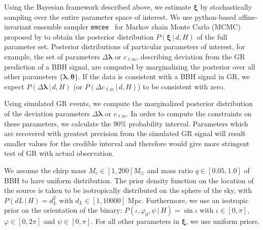 \documentclass[prd,preprintnumbers,twocolumn,eqsecnum,floatfix,a4paper,nofootinbib,superscriptaddress]{revtex4}
\newcommand{\blambda}{\bm{\lambda}}
\newcommand{\btheta}{\bm{\theta}}
\newcommand{\bxi}{\bm{\xi}}
\begin{document}
Using the Bayesian framework described above, we estimate $\bxi$ by stochastically sampling over the entire parameter space of interest. We use python-based affine-invariant ensemble sampler \texttt{emcee}~\cite{foreman2013emcee} for Markov chain Monte Carlo (MCMC) proposed by \cite{goodman2010ensemble} to obtain the posterior distribution $P(\bxi \, | \, d, H)$ of the full parameter set. Posterior distributions of particular parameters of interest, for example,  the set of parameters ${\Delta \blambda}$ or $c_{\ell m}$, describing deviation from the GR prediction of a BBH signal, are computed  by marginalizing the posterior over all other parameters $\{\blambda, \btheta\}$. If the data is consistent with a BBH signal in GR, we expect $P(\Delta \blambda \, | \, d, H)$ (or $P(\Delta c_{\ell m} \, | \, d, H)$) to be consistent with zero. 

Using simulated GR events, we compute the marginalized posterior distribution of the deviation parameters  ${\Delta \blambda}$ or $c_{\ell m}$. In order to compute the constraints on these parameters, we calculate the 90\% probability interval. Parameters which are recovered with greatest precision from the simulated GR signal will result smaller values for the credible interval and therefore would give more stringent test of GR with actual observation.

We assume the chirp mass $M_c \in [1,200] M_\odot$ and mass ratio $q \in [0.05,1.0]$ of BBH to have uniform distribution. The prior density function on the location of the source is  taken  to  be  isotropically  distributed  on  the  sphere of  the  sky,  with $P({dL} \, | \, H)=d_{L}^{2}$ with $d_L \in [1,10000]$ Mpc. Furthermore, we use an  isotropic  prior  on  the  orientation  of  the  binary: $P({\iota,\varphi_0,\psi} \, | \, H)=\sin\iota$ with $\iota \in [0,\pi]$, $\varphi \in [0,2\pi]$ and $\psi \in [0,\pi]$. For all other parameters in $\bxi$, we use uniform priors.
\end{document}

